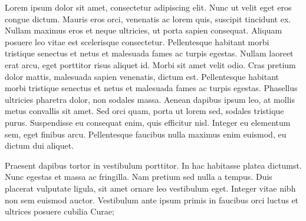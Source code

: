 \documentclass{article}
\begin{document}

Lorem ipsum dolor sit amet, consectetur adipiscing elit. Nunc ut velit eget eros congue dictum. Mauris eros orci, venenatis ac lorem quis, suscipit tincidunt ex. Nullam maximus eros et neque ultricies, ut porta sapien consequat. Aliquam posuere leo vitae est scelerisque consectetur. Pellentesque habitant morbi tristique senectus et netus et malesuada fames ac turpis egestas. Nullam laoreet erat arcu, eget porttitor risus aliquet id. Morbi sit amet velit odio. Cras pretium dolor mattis, malesuada sapien venenatis, dictum est. Pellentesque habitant morbi tristique senectus et netus et malesuada fames ac turpis egestas. Phasellus ultricies pharetra dolor, non sodales massa. Aenean dapibus ipsum leo, at mollis metus convallis sit amet. Sed orci quam, porta ut lorem sed, sodales tristique purus. Suspendisse eu consequat enim, quis efficitur nisl. Integer eu elementum sem, eget finibus arcu. Pellentesque faucibus nulla maximus enim euismod, eu dictum dui aliquet.

Praesent dapibus tortor in vestibulum porttitor. In hac habitasse platea dictumst. Nunc egestas et massa ac fringilla. Nam pretium sed nulla a tempus. Duis placerat vulputate ligula, sit amet ornare leo vestibulum eget. Integer vitae nibh non sem euismod auctor. Vestibulum ante ipsum primis in faucibus orci luctus et ultrices posuere cubilia Curae;
\end{document}
